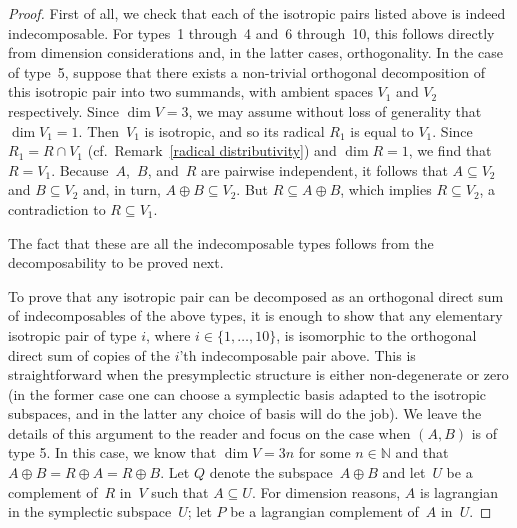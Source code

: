 \documentclass[pdftex]{sigma}
\numberwithin{equation}{section}
\begin{document}
\begin{proof}
First of all, we check that each of the isotropic pairs listed above is indeed indecomposable. For types~1 through~4 and~6 through~10,  this follows directly from dimension considerations and, in the latter cases, orthogonality. In the case of type~5, suppose that there exists a non-trivial orthogonal decomposition of this isotropic pair into two summands, with ambient spaces $V_1$ and $V_2$ respectively. Since $\dim V = 3$, we may assume without loss of generality that $\dim V_1 = 1$. Then~$V_1$ is isotropic, and so its radical $R_1$ is equal to $V_1$. Since $R_1 = R \cap V_1$ (cf.\ Remark~\ref{radical distributivity}) and $\dim R = 1$, we f\/ind that $R = V_1$. Because~$A$,~$B$, and~$R$ are pairwise independent, it follows that $A \subseteq V_2$ and $B \subseteq V_2$ and, in turn, $A \oplus B \subseteq V_2$. But $R \subseteq A \oplus B$, which implies $R \subseteq V_2$, a contradiction to $R \subseteq V_1$.

The fact that these are all the indecomposable types follows from the decomposability to be proved next.

To prove that any isotropic pair can be decomposed as an orthogonal direct sum of indecomposables of the above types, it is enough to show that any elementary isotropic pair of type $i$,
where $i \in \{1,\dots ,10\}$,  is isomorphic to the orthogonal direct sum of copies of the $i$'th indecomposable pair above. This is straightforward when the presymplectic structure is either non-degenerate or zero (in the former case one can choose a symplectic basis adapted to the isotropic subspaces, and in the latter any choice of basis will do the job). We leave the details of this argument  to the reader and focus on the case when $(A,B)$ is of type 5.   In this case, we know that $\dim V = 3n$ for some $n \in \mathbb{N}$ and that $A \oplus B  = R \oplus A = R \oplus B$. Let $Q$
denote the subspace~$A \oplus B$ and let~$U$ be a complement of~$R$ in~$V$ such that $A \subseteq U$. For dimension reasons, $A$ is lagrangian in the symplectic subspace~$U$; let $P$ be a lagrangian complement of~$A$ in~$U$.


\end{proof}
\end{document}
